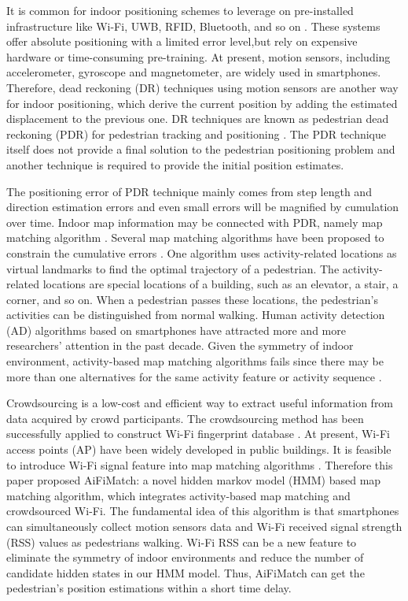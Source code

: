 \documentclass[conference]{IEEEtran}
\begin{document}
It is common for indoor positioning schemes to leverage on pre-installed infrastructure like Wi-Fi, UWB, RFID, Bluetooth, and so on \cite{bahl2000enhancements,ni2004landmarc}. These systems offer absolute positioning with a limited error level,but rely on expensive hardware or time-consuming pre-training. At present, motion sensors, including accelerometer, gyroscope and magnetometer, are widely used in smartphones. Therefore, dead reckoning (DR) techniques using motion sensors are another way for indoor positioning, which derive the current position by adding the estimated displacement to the previous one. DR techniques are known as  pedestrian dead reckoning (PDR) for pedestrian tracking and positioning \cite{zhou2015activity,zhou2015alimc}. The PDR technique itself does not provide a final solution to the pedestrian positioning problem and another technique is required to provide the initial position estimates.

The positioning error of PDR technique mainly comes from step length and direction estimation errors and even small errors will be magnified by cumulation over time. Indoor map information may be connected with PDR, namely map matching algorithm \cite{aly2015semmatch}. Several map matching algorithms have been proposed to constrain the cumulative errors \cite{zampella2015indoor,zhou2015activity,abdelnasser2016semanticslam,fu2017crowdsourcing}.  One algorithm uses activity-related locations as virtual landmarks to find the optimal trajectory of a pedestrian. The activity-related locations are special locations of a building, such as an elevator, a stair, a corner, and so on. When a pedestrian passes these locations, the pedestrian's activities can be distinguished from normal walking. Human activity detection (AD) algorithms based on smartphones have attracted more and more researchers' attention in the past decade. Given the symmetry of indoor environment, activity-based map matching algorithms fails since there may be more than one alternatives for the same activity feature or activity sequence \cite{zhou2015activity}.

Crowdsourcing is a low-cost and efficient way to extract useful information from data acquired by crowd participants. The crowdsourcing method has been successfully applied to construct Wi-Fi fingerprint database \cite{zhang2014robust}. At present, Wi-Fi access points (AP) have been widely developed in public buildings. It is feasible to introduce Wi-Fi signal feature into map matching algorithms \cite{seitz2010hidden}. Therefore this paper proposed AiFiMatch: a novel hidden markov model (HMM) based map matching algorithm, which integrates activity-based map matching and crowdsourced Wi-Fi. The fundamental idea of this algorithm is that smartphones can simultaneously collect motion sensors data and Wi-Fi received signal strength (RSS) values as pedestrians walking. Wi-Fi RSS can be a new feature to eliminate the symmetry of indoor environments and reduce the number of candidate hidden states in our HMM model. Thus, AiFiMatch can get the pedestrian's position estimations within a short time delay. 
\end{document}
